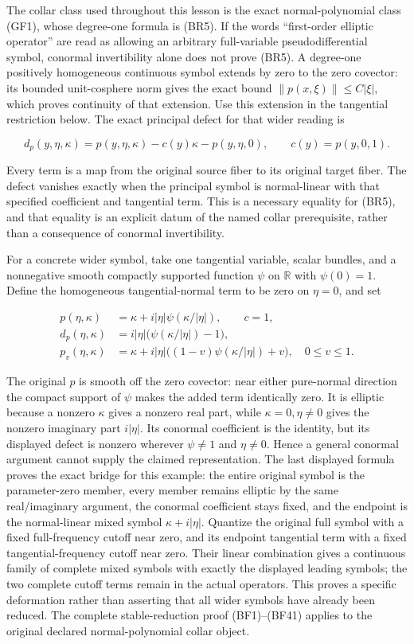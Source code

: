 \documentclass[
  11pt,
]{article}
\begin{document}
The collar class used throughout this lesson is the exact
normal-polynomial class (GF1), whose degree-one formula is (BR5). If the
words ``first-order elliptic operator'' are read as allowing an
arbitrary full-variable pseudodifferential symbol, conormal
invertibility alone does not prove (BR5). A degree-one positively
homogeneous continuous symbol extends by zero to the zero covector: its
bounded unit-cosphere norm gives the exact bound
\(\|p(x,\xi)\|\le C|\xi|\), which proves continuity of that extension.
Use this extension in the tangential restriction below. The exact
principal defect for that wider reading is

\[
 d_p(y,\eta,\kappa)
   =p(y,\eta,\kappa)-c(y)\kappa-p(y,\eta,0),
 \qquad c(y)=p(y,0,1).
 \tag{BF42}
\]

Every term is a map from the original source fiber to its original
target fiber. The defect vanishes exactly when the principal symbol is
normal-linear with that specified coefficient and tangential term. This
is a necessary equality for (BR5), and that equality is an explicit
datum of the named collar prerequisite, rather than a consequence of
conormal invertibility.

For a concrete wider symbol, take one tangential variable, scalar
bundles, and a nonnegative smooth compactly supported function \(\psi\)
on \(\mathbb R\) with \(\psi(0)=1\). Define the homogeneous
tangential-normal term to be zero on \(\eta=0\), and set

\[
 \begin{split}
 p(\eta,\kappa)&=\kappa+i|\eta|\psi(\kappa/|\eta|),\qquad c=1,\\
 d_p(\eta,\kappa)&=i|\eta|\bigl(\psi(\kappa/|\eta|)-1\bigr),\\
 p_v(\eta,\kappa)&=\kappa+i|\eta|
       \bigl((1-v)\psi(\kappa/|\eta|)+v\bigr),\quad0\le v\le1.
 \end{split}
 \tag{BF43}
\]

The original \(p\) is smooth off the zero covector: near either
pure-normal direction the compact support of \(\psi\) makes the added
term identically zero. It is elliptic because a nonzero \(\kappa\) gives
a nonzero real part, while \(\kappa=0,\eta\ne0\) gives the nonzero
imaginary part \(i|\eta|\). Its conormal coefficient is the identity,
but its displayed defect is nonzero wherever \(\psi\ne1\) and
\(\eta\ne0\). Hence a general conormal argument cannot supply the
claimed representation. The last displayed formula proves the exact
bridge for this example: the entire original symbol is the
parameter-zero member, every member remains elliptic by the same
real/imaginary argument, the conormal coefficient stays fixed, and the
endpoint is the normal-linear mixed symbol \(\kappa+i|\eta|\). Quantize
the original full symbol with a fixed full-frequency cutoff near zero,
and its endpoint tangential term with a fixed tangential-frequency
cutoff near zero. Their linear combination gives a continuous family of
complete mixed symbols with exactly the displayed leading symbols; the
two complete cutoff terms remain in the actual operators. This proves a
specific deformation rather than asserting that all wider symbols have
already been reduced. The complete stable-reduction proof (BF1)--(BF41)
applies to the original declared normal-polynomial collar object.
\end{document}
